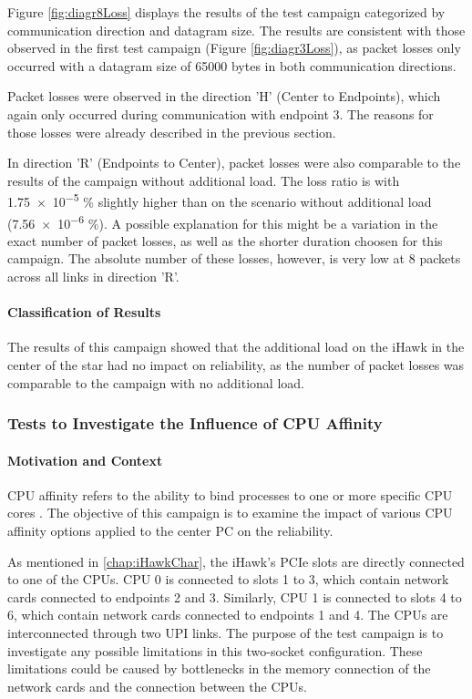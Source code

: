 Figure \ref{fig:diagr8Loss} displays the results of the test campaign categorized by communication direction and datagram size. The results are consistent with those observed in the first test campaign (Figure \ref{fig:diagr3Loss}), as packet losses only occurred with a datagram size of 65000 bytes in both communication directions.

Packet losses were observed in the direction 'H' (Center to Endpoints), which again only occurred during communication with endpoint 3. The reasons for those losses were already described in the previous section.

In direction 'R' (Endpoints to Center), packet losses were also comparable to the results of the campaign without additional load. The loss ratio is with \num{1.75e-5} \% slightly higher than on the scenario without additional load (\num{7.56e-6} \%). A possible explanation for this might be a variation in the exact number of packet losses, as well as the shorter duration choosen for this campaign. The absolute number of these losses, however, is very low at 8 packets across all links in direction 'R'.

\paragraph{Classification of Results}
The results of this campaign showed that the additional load on the iHawk in the center of the star had no impact on reliability, as the number of packet losses was comparable to the campaign with no additional load.


\subsubsection{Tests to Investigate the Influence of CPU Affinity}
\paragraph{Motivation and Context}

CPU affinity refers to the ability to bind processes to one or more specific CPU cores \cite{reli06}. The objective of this campaign is to examine the impact of various CPU affinity options applied to the center PC on the reliability.

As mentioned in \ref{chap:iHawkChar}, the iHawk's PCIe slots are directly connected to one of the CPUs. CPU 0 is connected to slots 1 to 3, which contain network cards connected to endpoints 2 and 3. Similarly, CPU 1 is connected to slots 4 to 6, which contain network cards connected to endpoints 1 and 4. The CPUs are interconnected through two UPI links. The purpose of the test campaign is to investigate any possible limitations in this two-socket configuration. These limitations could be caused by bottlenecks in the memory connection of the network cards and the connection between the CPUs.

